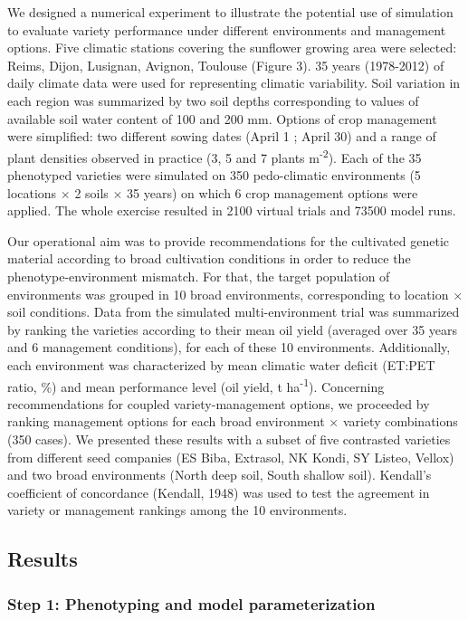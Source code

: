 \documentclass[a4paper]{article}
\begin{document}
We designed a numerical experiment to illustrate the potential use of
simulation to evaluate variety performance under different environments
and management options. Five climatic stations covering the sunflower
growing area were selected: Reims, Dijon, Lusignan, Avignon, Toulouse
(Figure 3). 35 years (1978-2012) of daily climate data were used for
representing climatic variability. Soil variation in each region was
summarized by two soil depths corresponding to values of available soil
water content of 100 and 200 mm. Options of crop management were
simplified: two different sowing dates (April 1 ; April 30) and a range
of plant densities observed in practice (3, 5 and 7 plants
m\textsuperscript{-2}). Each of the 35 phenotyped varieties were
simulated on 350 pedo-climatic environments (5 locations \(\times\) 2
soils \(\times\) 35 years) on which 6 crop management options were
applied. The whole exercise resulted in 2100 virtual trials and 73500
model runs.

Our operational aim was to provide recommendations for the cultivated
genetic material according to broad cultivation conditions in order to
reduce the phenotype-environment mismatch. For that, the target
population of environments was grouped in 10 broad environments,
corresponding to location \(\times\) soil conditions. Data from the
simulated multi-environment trial was summarized by ranking the
varieties according to their mean oil yield (averaged over 35 years and
6 management conditions), for each of these 10 environments.
Additionally, each environment was characterized by mean climatic water
deficit (ET:PET ratio, \%) and mean performance level (oil yield, t
ha\textsuperscript{-1}). Concerning recommendations for coupled
variety-management options, we proceeded by ranking management options
for each broad environment \(\times\) variety combinations (350 cases).
We presented these results with a subset of five contrasted varieties
from different seed companies (ES Biba, Extrasol, NK Kondi, SY Listeo,
Vellox) and two broad environments (North deep soil, South shallow
soil). Kendall's coefficient of concordance (Kendall, 1948) was used to
test the agreement in variety or management rankings among the 10
environments.

\subsection{Results}\label{results}

\subsubsection{Step 1: Phenotyping and model
parameterization}\label{step-1-phenotyping-and-model-parameterization-1}
\end{document}

